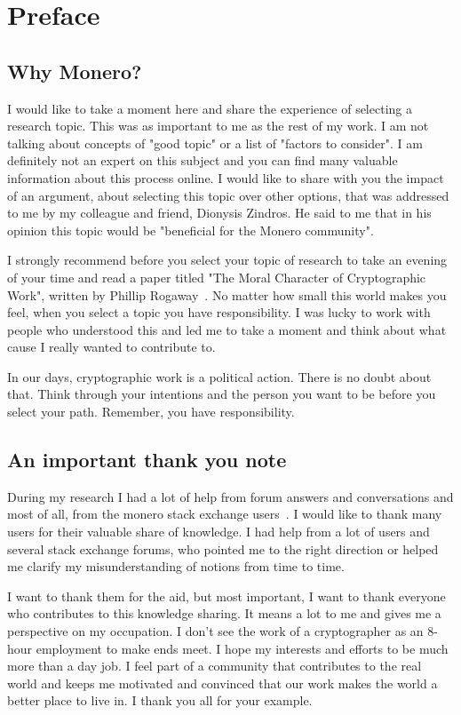 \setcounter{chapter}{-1}
\chapter{Preface}
%
\section{Why Monero?}
I would like to take a moment here and share the experience of selecting a research topic. This was as important to me as the rest of my work. I am not talking about concepts of "good topic" or a list of "factors to consider". I am definitely not an expert on this subject and you can find many valuable information about this process online. I would like to share with you the impact of an argument, about selecting this topic over other options, that was addressed to me by my colleague and friend, Dionysis Zindros. He said to me that in his opinion this topic would be "beneficial for the Monero community".

I strongly recommend before you select your topic of research to take an evening of your time and read a paper titled "The Moral Character of Cryptographic Work", written by Phillip Rogaway~\cite{moral}. No matter how small this world makes you feel, when you select a topic you have responsibility. I was lucky to work with people who understood this and led me to take a moment and think about what cause I really wanted to contribute to.

In our days, cryptographic work is a political action. There is no doubt about that. Think through your intentions and the person you want to be before you select your path. Remember, you have responsibility.
%
\section{An important thank you note}
During my research I had a lot of help from forum answers and conversations and most of all, from the monero stack exchange users~\cite{stackexchange}. I would like to thank many users for their valuable share of knowledge. I had help from a lot of users and several stack exchange forums, who pointed me to the right direction or helped me clarify my misunderstanding of notions from time to time.
\pagebreak

I want to thank them for the aid, but most important, I want to thank everyone who contributes to this knowledge sharing. It means a lot to me and gives me a perspective on my occupation. I don't see the work of a cryptographer as an 8-hour employment to make ends meet. I hope my interests and efforts to be much more than a day job. I feel part of a community that contributes to the real world and keeps me motivated and convinced that our work makes the world a better place to live in. I thank you all for your example.
%
